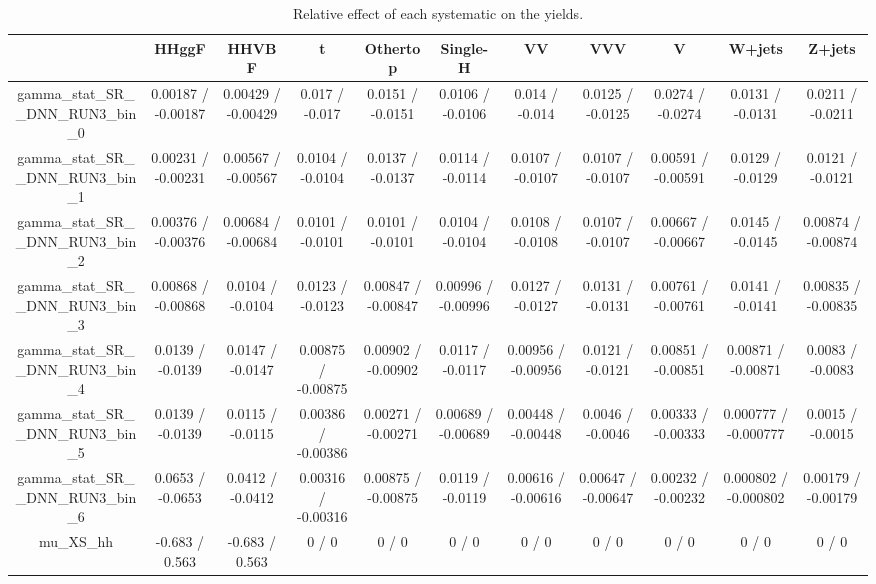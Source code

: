 \documentclass[10pt]{article}
\begin{document}
\begin{table}[htbp]
\begin{center}
\begin{tabular}{|c|c|c|c|c|c|c|c|c|c|c|}
\hline 
      & HHggF      & HHVBF      & t      & Othertop      & Single-H      & VV      & VVV      & V      & W+jets      & Z+jets \\ 
\hline 
  gamma_stat_SR__DNN_RUN3_bin_0 & 0.00187 / -0.00187 & 0.00429 / -0.00429 & 0.017 / -0.017 & 0.0151 / -0.0151 & 0.0106 / -0.0106 & 0.014 / -0.014 & 0.0125 / -0.0125 & 0.0274 / -0.0274 & 0.0131 / -0.0131 & 0.0211 / -0.0211 \\ 
  gamma_stat_SR__DNN_RUN3_bin_1 & 0.00231 / -0.00231 & 0.00567 / -0.00567 & 0.0104 / -0.0104 & 0.0137 / -0.0137 & 0.0114 / -0.0114 & 0.0107 / -0.0107 & 0.0107 / -0.0107 & 0.00591 / -0.00591 & 0.0129 / -0.0129 & 0.0121 / -0.0121 \\ 
  gamma_stat_SR__DNN_RUN3_bin_2 & 0.00376 / -0.00376 & 0.00684 / -0.00684 & 0.0101 / -0.0101 & 0.0101 / -0.0101 & 0.0104 / -0.0104 & 0.0108 / -0.0108 & 0.0107 / -0.0107 & 0.00667 / -0.00667 & 0.0145 / -0.0145 & 0.00874 / -0.00874 \\ 
  gamma_stat_SR__DNN_RUN3_bin_3 & 0.00868 / -0.00868 & 0.0104 / -0.0104 & 0.0123 / -0.0123 & 0.00847 / -0.00847 & 0.00996 / -0.00996 & 0.0127 / -0.0127 & 0.0131 / -0.0131 & 0.00761 / -0.00761 & 0.0141 / -0.0141 & 0.00835 / -0.00835 \\ 
  gamma_stat_SR__DNN_RUN3_bin_4 & 0.0139 / -0.0139 & 0.0147 / -0.0147 & 0.00875 / -0.00875 & 0.00902 / -0.00902 & 0.0117 / -0.0117 & 0.00956 / -0.00956 & 0.0121 / -0.0121 & 0.00851 / -0.00851 & 0.00871 / -0.00871 & 0.0083 / -0.0083 \\ 
  gamma_stat_SR__DNN_RUN3_bin_5 & 0.0139 / -0.0139 & 0.0115 / -0.0115 & 0.00386 / -0.00386 & 0.00271 / -0.00271 & 0.00689 / -0.00689 & 0.00448 / -0.00448 & 0.0046 / -0.0046 & 0.00333 / -0.00333 & 0.000777 / -0.000777 & 0.0015 / -0.0015 \\ 
  gamma_stat_SR__DNN_RUN3_bin_6 & 0.0653 / -0.0653 & 0.0412 / -0.0412 & 0.00316 / -0.00316 & 0.00875 / -0.00875 & 0.0119 / -0.0119 & 0.00616 / -0.00616 & 0.00647 / -0.00647 & 0.00232 / -0.00232 & 0.000802 / -0.000802 & 0.00179 / -0.00179 \\ 
  mu_XS_hh & -0.683 / 0.563 & -0.683 / 0.563 & 0 / 0 & 0 / 0 & 0 / 0 & 0 / 0 & 0 / 0 & 0 / 0 & 0 / 0 & 0 / 0 \\ 
\hline 
\end{tabular} 
\caption{Relative effect of each systematic on the yields.} 
\end{center} 
\end{table} 
\end{document}
